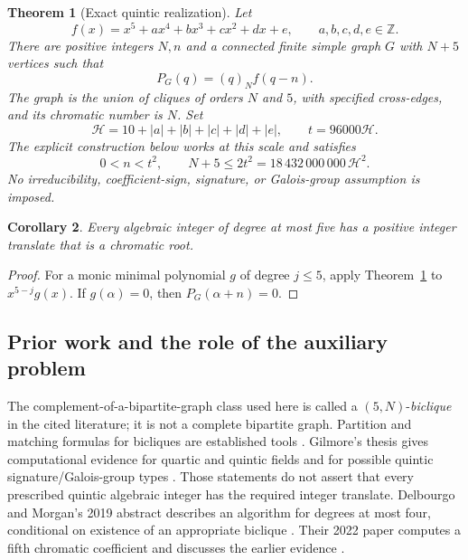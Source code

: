 \documentclass[11pt,a4paper]{article}
\newtheorem{theorem}{Theorem}[section]
\newtheorem{corollary}[theorem]{Corollary}
\theoremstyle{definition}
\newcommand{\Z}{\mathbb Z}
\newcommand{\fall}[2]{(#1)_{#2}}
\newcommand{\htf}{\mathcal H}
\begin{document}
\begin{theorem}[Exact quintic realization]\label{thm:main}
Let
\[
 f(x)=x^5+ax^4+bx^3+cx^2+dx+e,\qquad a,b,c,d,e\in\Z.
\]
There are positive integers $N,n$ and a connected finite simple graph $G$
with $N+5$ vertices such that
\begin{equation}\label{eq:main}
 P_G(q)=\fall qN f(q-n).
\end{equation}
The graph is the union of cliques of orders $N$ and $5$, with specified
cross-edges, and its chromatic number is $N$.
Set
\begin{equation}\label{eq:scale}
 \htf=10+|a|+|b|+|c|+|d|+|e|,\qquad t=96000\htf.
\end{equation}
The explicit construction below works at this scale and satisfies
\begin{equation}\label{eq:bounds}
 0<n<t^2,\qquad N+5\le2t^2
 =18\,432\,000\,000\,\htf^2.
\end{equation}
No irreducibility, coefficient-sign, signature, or Galois-group assumption
is imposed.
\end{theorem}

\begin{corollary}\label{cor:degree}
Every algebraic integer of degree at most five has a positive integer
translate that is a chromatic root.
\end{corollary}
\begin{proof}
For a monic minimal polynomial $g$ of degree $j\le5$, apply
Theorem~\ref{thm:main} to $x^{5-j}g(x)$. If $g(\alpha)=0$, then
$P_G(\alpha+n)=0$.
\end{proof}

\subsection{Prior work and the role of the auxiliary problem}

The complement-of-a-bipartite-graph class used here is called a
$(5,N)$-\emph{biclique} in the cited literature; it is not a complete
bipartite graph. Partition and matching formulas for bicliques are
established tools \cite{Bohn,CM}. Gilmore's thesis gives computational
evidence for quartic and quintic fields and for possible quintic
signature/Galois-group types \cite[Chapter 7]{Gilmore}. Those statements
do not assert that every prescribed quintic algebraic integer has the
required integer translate. Delbourgo and Morgan's 2019 abstract describes
an algorithm for degrees at most four, conditional on existence of an
appropriate biclique \cite{DM19}. Their 2022 paper computes a fifth
chromatic coefficient and discusses the earlier evidence
\cite[Sections 1.1 and 1.3]{DM22}.
\end{document}
